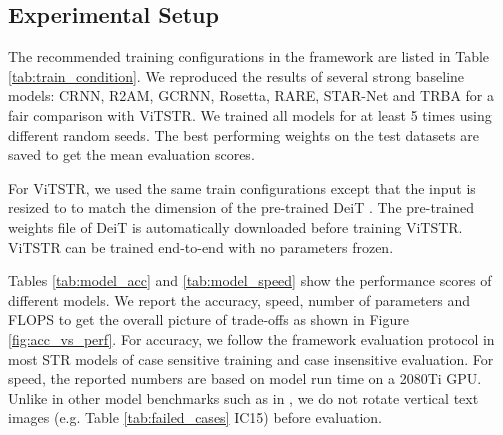 \documentclass[runningheads]{llncs}
\begin{document}
\subsection{Experimental Setup}

The recommended training configurations in the framework are listed in Table \ref{tab:train_condition}. We reproduced the results of several strong baseline models: CRNN, R2AM, GCRNN, Rosetta, RARE, STAR-Net and TRBA for a fair comparison with ViTSTR. We trained all models for at least 5 times using different random seeds. The best performing weights on the test datasets are saved to get the mean evaluation scores. 

For ViTSTR, we used the same train configurations except that the input is resized to  to match the dimension of the pre-trained DeiT \cite{touvron2020training}. The pre-trained weights file of DeiT is automatically downloaded before training ViTSTR. ViTSTR can be trained end-to-end with no parameters frozen.


Tables \ref{tab:model_acc} and \ref{tab:model_speed} show the performance scores of different models. We report the accuracy, speed, number of parameters and FLOPS to get the overall picture of trade-offs as shown in Figure \ref{fig:acc_vs_perf}. For accuracy, we follow the framework evaluation protocol in most STR models of case sensitive training and case insensitive evaluation. For speed, the reported numbers are based on model run time on a 2080Ti GPU. Unlike in other model benchmarks such as in \cite{li2019show,litman2020scatter}, we do not rotate vertical text images (e.g. Table \ref{tab:failed_cases} IC15) before evaluation. 
\end{document}
